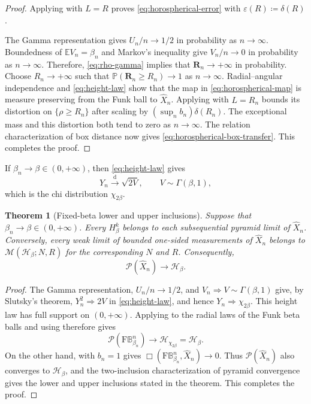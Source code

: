 \documentclass[10pt,a4paper]{amsart}
\numberwithin{equation}{section}
\newtheorem{theorem}{Theorem}[section]
\newcommand{\BetaBall}{\mathrm F\mathbb B^n_{\beta_n}}
\newcommand{\Pyr}{\mathcal P}
\newcommand{\eps}{\varepsilon}
\begin{document}
\begin{proof}
Applying  with $L=R$ proves \eqref{eq:horospherical-error} with $\eps(R)\coloneqq\delta(R)$.

The Gamma representation gives $U_n/n\to1/2$ in probability as $n\to\infty$.  Boundedness of $\mathbb EV_n=\beta_n$ and Markov's inequality give $V_n/n\to0$ in probability as $n\to\infty$.  Therefore, \eqref{eq:rho-gamma} implies that $\mathbf R_n\to+\infty$ in probability.  Choose $R_n\to+\infty$ such that $\mathbb P(\mathbf R_n\ge R_n)\to1$ as $n\to\infty$.  Radial--angular independence and \eqref{eq:height-law} show that the map in \eqref{eq:horospherical-map} is measure preserving from the Funk ball to $\widehat X_n$.  Applying  with $L=R_n$ bounds its distortion on $\{\rho\ge R_n\}$ after scaling by $(\sup_nb_n)\delta(R_n)$.  The exceptional mass and this distortion both tend to zero as $n\to\infty$.  The relation characterization of box distance now gives \eqref{eq:horospherical-box-transfer}.  This completes the proof.
\end{proof}

If $\beta_n\to\beta\in(0,+\infty)$, then \eqref{eq:height-law} gives
\begin{equation}\label{eq:height-fixed-beta} Y_n\overset{\mathrm{d}}{\longrightarrow}\sqrt{2V}, \qquad V\sim\Gamma(\beta,1), \end{equation}
which is the chi distribution $\chi_{2\beta}$.

\begin{theorem}[Fixed-beta lower and upper inclusions]\label{thm:fixed-beta-convergence}
Suppose that $\beta_n\to\beta\in(0,+\infty)$.  Every $H_\beta^k$ belongs to each subsequential pyramid limit of $\widehat X_n$.  Conversely, every weak limit of bounded one-sided measurements of $\widehat X_n$ belongs to $\mathcal M(\mathcal H_\beta;N,R)$ for the corresponding $N$ and $R$.  Consequently,
\[ \Pyr(\widehat X_n)\longrightarrow\mathcal H_\beta. \]
\end{theorem}

\begin{proof}
The Gamma representation, $U_n/n\to1/2$, and $V_n\Rightarrow V\sim\Gamma(\beta,1)$ give, by Slutsky's theorem,
$Y_n^2\Rightarrow2V$ in \eqref{eq:height-law}, and hence $Y_n\Rightarrow\chi_{2\beta}$.  This height law has full support
on $(0,+\infty)$.  Applying  to the radial laws of the Funk beta balls and using
 therefore gives
\[
 \Pyr(\BetaBall)\longrightarrow\mathcal H_{\chi_{2\beta}}=\mathcal H_\beta.
\]
On the other hand,  with $b_n=1$ gives
$\Box(\BetaBall,\widehat X_n)\to0$.  Thus $\Pyr(\widehat X_n)$ also converges to $\mathcal H_\beta$, and the
two-inclusion characterization of pyramid convergence gives the lower and upper inclusions stated in the theorem.  This
completes the proof.
\end{proof}
\end{document}
